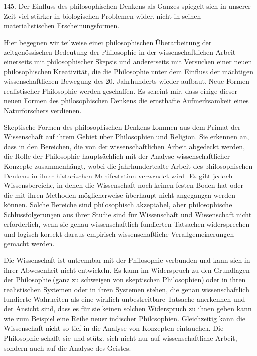 \documentclass[11pt,a4paper]{book}
\begin{document}
145. Der Einfluss des philosophischen Denkens als Ganzes spiegelt sich in unserer Zeit viel stärker in biologischen Problemen wider, nicht in seinen materialistischen Erscheinungsformen.



Hier begegnen wir teilweise einer philosophischen Überarbeitung der zeitgenössischen Bedeutung der Philosophie in der wissenschaftlichen Arbeit -- einerseits mit philosophischer Skepsis und andererseits mit Versuchen einer neuen philosophischen Kreativität, die die Philosophie unter dem Einfluss der mächtigen wissenschaftlichen Bewegung des 20. Jahrhunderts wieder aufbaut. Neue Formen realistischer Philosophie werden geschaffen. Es scheint mir, dass einige dieser neuen Formen des philosophischen Denkens die ernsthafte Aufmerksamkeit eines Naturforschers verdienen.



Skeptische Formen des philosophischen Denkens kommen aus dem Primat der Wissenschaft auf ihrem Gebiet über Philosophien und Religion. Sie erkennen an, dass in den Bereichen, die von der wissenschaftlichen Arbeit abgedeckt werden, die Rolle der Philosophie hauptsächlich mit der Analyse wissenschaftlicher Konzepte zusammenhängt, wobei die jahrhundertealte Arbeit des philosophischen Denkens in ihrer historischen Manifestation verwendet wird. Es gibt jedoch Wissensbereiche, in denen die Wissenschaft noch keinen festen Boden hat oder die mit ihren Methoden möglicherweise überhaupt nicht angegangen werden können. Solche Bereiche sind philosophisch akzeptabel, aber philosophische Schlussfolgerungen aus ihrer Studie sind für Wissenschaft und Wissenschaft nicht erforderlich, wenn sie genau wissenschaftlich fundierten Tatsachen widersprechen und logisch korrekt daraus empirisch-wissenschaftliche Verallgemeinerungen gemacht werden.



Die Wissenschaft ist untrennbar mit der Philosophie verbunden und kann sich in ihrer Abwesenheit nicht entwickeln. Es kann im Widerspruch zu den Grundlagen der Philosophie (ganz zu schweigen von skeptischen Philosophien) oder in ihren realistischen Systemen oder in ihren Systemen stehen, die genau wissenschaftlich fundierte Wahrheiten als eine wirklich unbestreitbare Tatsache anerkennen und der Ansicht sind, dass es für sie keinen solchen Widerspruch zu ihnen geben kann wie zum Beispiel eine Reihe neuer indischer Philosophien. Gleichzeitig kann die Wissenschaft nicht so tief in die Analyse von Konzepten eintauchen. Die Philosophie schafft sie und stützt sich nicht nur auf wissenschaftliche Arbeit, sondern auch auf die Analyse des Geistes.
\end{document}
